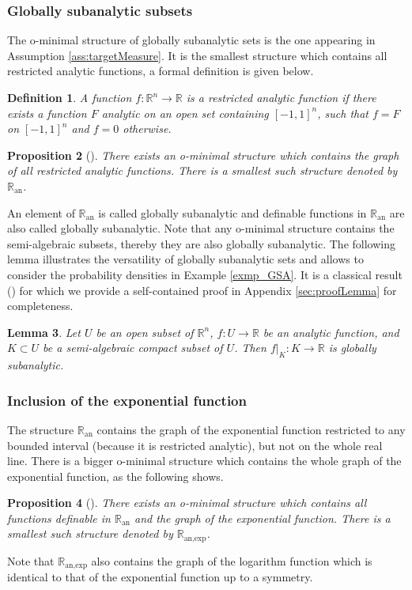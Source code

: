 \documentclass[11pt]{article}
\newcommand{\R}{\mathbb R}
\newcommand{\1}{\mathbbm{1}}
\newtheorem{lem}{Lemma}[section]
\newtheorem{defn}[lem]{Definition}
\newtheorem{prop}[lem]{Proposition}
\numberwithin{equation}{section}
\begin{document}
\subsubsection{Globally subanalytic subsets}\label{global_subanalyticity}
The o-minimal structure of globally subanalytic sets is the one appearing in Assumption \ref{ass:targetMeasure}. It is the smallest structure which contains all restricted analytic functions, a formal definition is given below.
\begin{defn}
	A function $f:\mathbb{R}^{n}\longrightarrow \mathbb{R}$ is a restricted analytic function if there exists a function $F$ analytic on an open set containing $[-1,1]^{n}$, such that $f=F$ on $[-1,1]^n$ and $f=0$ otherwise. 
\end{defn}
\begin{prop}[\cite{van1986generalization}]
	\label{prop:globalSubanalytic}
	There exists an o-minimal structure which contains the graph of all restricted analytic functions. There is a smallest such structure denoted by $\mathbb{R}_{\text{an}}$. 
\end{prop}
An element of $\mathbb{R}_{\text{an}}$ is called globally subanalytic and definable functions in $\mathbb{R}_{\text{an}}$ are also called globally subanalytic. Note that any o-minimal structure contains the semi-algebraic subsets, thereby they are also globally subanalytic. The following lemma illustrates the versatility of globally subanalytic sets and allows to consider the probability densities in Example \ref{exmp_GSA}. It is a classical result (\cite[D.10]{driesmiller}) for which we provide a self-contained proof in Appendix \ref{sec:proofLemma} for completeness.

\begin{lem}\label{prop_exmp_GSA}
	Let  $U$ be an open subset of $\mathbb{R}^{n}$, $f:U\longrightarrow \mathbb{R}$ be an analytic function, and $K\subset U$ be a semi-algebraic compact subset of $U$. Then $f|_{K}: K \to \R$ is globally subanalytic.  
\end{lem}


\subsubsection{Inclusion of the exponential function}
The structure $\R_{\text{an}}$ contains the graph of the exponential function restricted to any bounded interval (because it is restricted analytic), but not on the whole real line. There is a bigger o-minimal structure which contains the whole graph of the exponential function, as the following shows.
\begin{prop}[\cite{Dries1995OnTR}]
	\label{prop:anExp}
	There exists an o-minimal structure which contains all functions definable in $\mathbb{R}_{\text{an}}$ and the graph of the exponential function. There is a smallest such structure denoted by $\mathbb{R}_{\text{an,exp}}$. 
\end{prop}
Note that $\mathbb{R}_{\text{an,exp}}$ also contains the graph of the logarithm function which is identical to that of the exponential function up to a symmetry.
\end{document}

